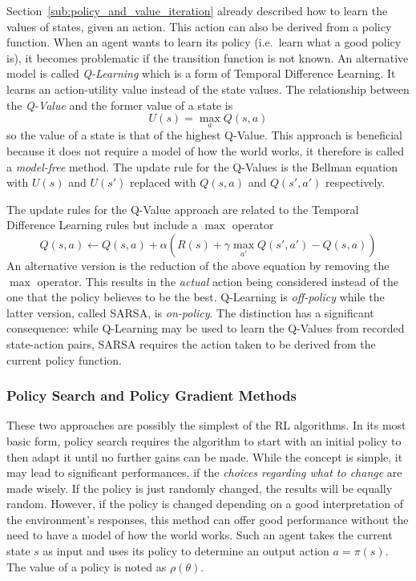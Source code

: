 Section~\ref{sub:policy_and_value_iteration} already described how to learn the values of states, given an
action. This action can also be derived from a policy function. When an agent wants to learn its policy
(i.e.\ learn what a good policy is), it becomes problematic if the transition function is not known. An alternative
model is called \emph{Q-Learning} which is a form of Temporal Difference Learning. It learns an action-utility value
instead of the state values. The relationship between the \emph{Q-Value} and the former value of a state is
\begin{equation}
    U(s) = \max_{a}Q(s,a)
\end{equation}
so the value of a state is that of the highest Q-Value. This approach is beneficial because it does not require a model
of how the world works, it therefore is called a \emph{model-free} method. The update rule for the Q-Values is
the Bellman equation with $U(s)$ and $U(s')$ replaced with $Q(s,a)$ and $Q(s',a')$ respectively.

The update rules for the Q-Value approach are related to the Temporal Difference Learning rules but include a $\max$
operator
\begin{equation}
    Q(s,a) \gets Q(s,a) + \alpha(R(s) + \gamma \max_{a'}Q(s', a') - Q(s,a))
\end{equation}
An alternative version is the reduction of the above equation by removing the $\max$ operator. This results in the
\emph{actual} action being considered instead of the one that the policy believes to be the best. Q-Learning is
\emph{off-policy} while the latter version, called \ac{SARSA}, is \emph{on-policy}. The distinction has a significant
consequence: while Q-Learning may be used to learn the Q-Values from recorded state-action pairs, \ac{SARSA} requires
the action taken to be derived from the current policy function.

\subsubsection{Policy Search and Policy Gradient Methods}%
\label{sub:policy_search_and_policy_gradient_methods}

These two approaches are possibly the simplest of the \ac{RL} algorithms. In its most basic form, policy search requires
the algorithm to start with an initial policy to then adapt it until no further gains can be made. While the
concept is simple, it may lead to significant performances, if the \emph{choices regarding what to change} are made
wisely. If the policy is just randomly changed, the results will be equally random. However, if the policy is changed depending
on a good interpretation of the environment's responses, this method can offer good performance without the need
to have a model of how the world works. Such an agent takes the current state $s$ as input and uses its policy to
determine an output action $a = \pi(s)$. The value of a policy is noted as $\rho(\theta)$.

